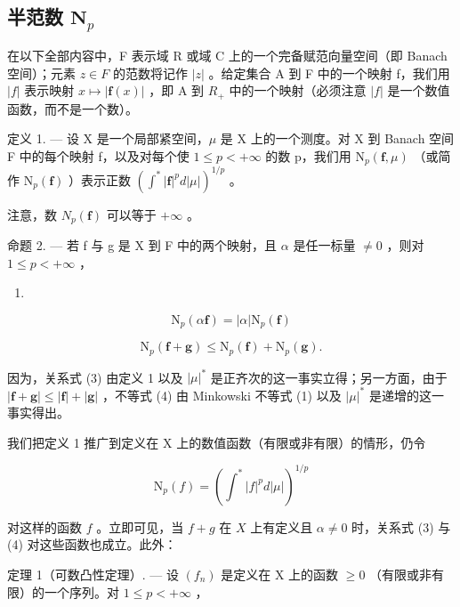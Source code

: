 \subsection{\texorpdfstring{半范数 \(\mathbf{N}_p\)}{半范数 N sub p}}

在以下全部内容中，F 表示域 R 或域 C 上的一个完备赋范向量空间（即 Banach 空间）；元素 \(z \in F\) 的范数将记作 \(|z|\) 。给定集合 A 到 F 中的一个映射 f，我们用 \(|f|\) 表示映射 \(x \mapsto |\mathbf{f}(x)|\) ，即 A 到 \(R_{+}\) 中的一个映射（必须注意 \(|f|\) 是一个数值函数，而不是一个数）。

定义 1. --- 设 X 是一个局部紧空间，\(\mu\) 是 X 上的一个测度。对 X 到 Banach 空间 F 中的每个映射 f，以及对每个使 \(1 \leqslant p < +\infty\) 的数 p，我们用 \(\mathrm{N}_p(\mathbf{f}, \mu)\) （或简作 \(\mathrm{N}_p(\mathbf{f})\) ）表示正数 \((\int^* |\mathbf{f}|^p d|\mu|)^{1/p}\) 。

注意，数 \(N_{p}(\mathbf{f})\) 可以等于 \(+\infty\) 。

命题 2. --- 若 f 与 g 是 X 到 F 中的两个映射，且 \(\alpha\) 是任一标量 \(\neq 0\) ，则对 \(1 \leqslant p < +\infty\) ，

\begin{enumerate}
\def\labelenumi{(\arabic{enumi})}
\setcounter{enumi}{2}
\tightlist
\item
\end{enumerate}

\[
\mathrm{N} _ {p} (\alpha \mathbf {f}) = | \alpha | \mathrm{N} _ {p} (\mathbf {f})\tag{4}
\]

\[
\mathrm{N} _ {p} (\mathbf {f} + \mathbf {g}) \leqslant \mathrm{N} _ {p} (\mathbf {f}) + \mathrm{N} _ {p} (\mathbf {g}).
\]

因为，关系式 (3) 由定义 1 以及 \(|\mu|^*\) 是正齐次的这一事实立得；另一方面，由于 \(|\mathbf{f} + \mathbf{g}| \leqslant |\mathbf{f}| + |\mathbf{g}|\) ，不等式 (4) 由 Minkowski 不等式 (1) 以及 \(|\mu|^*\) 是递增的这一事实得出。

我们把定义 1 推广到定义在 X 上的数值函数（有限或非有限）的情形，仍令

\[
\mathrm{N} _ {p} (f) = \left(\int^ {*} | f | ^ {p} d | \mu |\right) ^ {1 / p}
\]

对这样的函数 \(f\) 。立即可见，当 \(f + g\) 在 \(X\) 上有定义且 \(\alpha \neq 0\) 时，关系式 (3) 与 (4) 对这些函数也成立。此外：

定理 1（可数凸性定理）. --- 设 \((f_n)\) 是定义在 X 上的函数 \(\geqslant 0\) （有限或非有限）的一个序列。对 \(1 \leqslant p < +\infty\) ，

